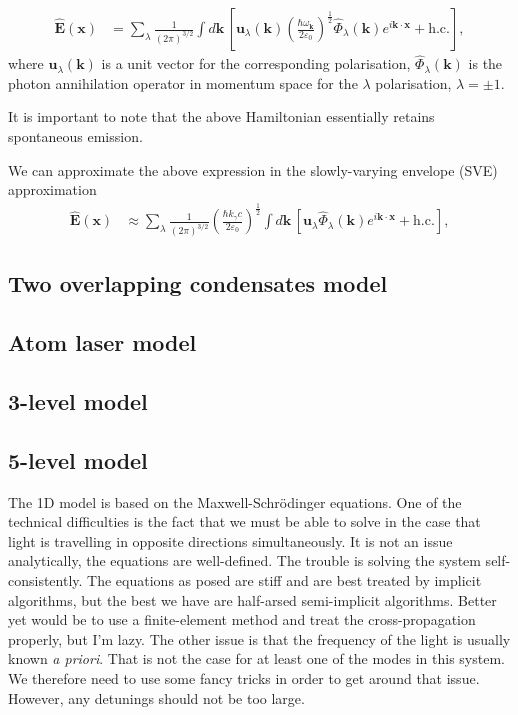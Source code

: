 \begin{align}
    \hat{\bm{E}}(\bm{x}) &= \sum_\lambda \frac{1}{(2\pi)^{3/2}} \int d \bm{k}\, \left[\bm{u}_\lambda(\bm{k}) \left(\frac{\hbar \omega_{\bm{k}}}{2\varepsilon_0} \right)^{\frac{1}{2}} \hat{\Phi}_\lambda(\bm{k}) e^{i \bm{k} \cdot \bm{x}} + \text{h.c.}\right],
\end{align}
where $\bm{u}_\lambda(\bm{k})$ is a unit vector for the corresponding polarisation, $\hat{\Phi}_\lambda(\bm{k})$ is the photon annihilation operator in momentum space for the $\lambda$ polarisation, $\lambda = \pm 1$.

It is important to note that the above Hamiltonian essentially retains spontaneous emission.

We can approximate the above expression in the slowly-varying envelope (SVE) approximation
\begin{align}
    \hat{\bm{E}}(\bm{x}) &\approx \sum_\lambda \frac{1}{(2\pi)^{3/2}} \left(\frac{\hbar k_\gamma c}{2\varepsilon_0} \right)^{\frac{1}{2}} \int d \bm{k}\, \left[\bm{u}_\lambda \hat{\Phi}_\lambda(\bm{k}) e^{i \bm{k} \cdot \bm{x}} + \text{h.c.}\right],
\end{align}

\subsection{Two overlapping condensates model}

\subsection{Atom laser model}

\subsection{3-level model}

\subsection{5-level model}
The 1D model is based on the Maxwell-Schrödinger equations.  One of the technical difficulties is the fact that we must be able to solve in the case that light is travelling in opposite directions simultaneously.  It is not an issue analytically, the equations are well-defined.  The trouble is solving the system self-consistently.  The equations as posed are stiff and are best treated by implicit algorithms, but the best we have are half-arsed semi-implicit algorithms. Better yet would be to use a finite-element method and treat the cross-propagation properly, but I'm lazy.  The other issue is that the frequency of the light is usually known \emph{a priori}.  That is not the case for at least one of the modes in this system.  We therefore need to use some fancy tricks in order to get around that issue.  However, any detunings should not be too large.

